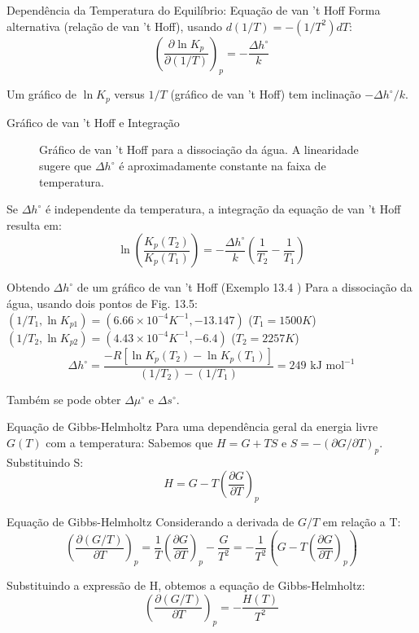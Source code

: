 \documentclass{beamer}
\begin{document}
\begin{frame}{Dependência da Temperatura do Equilíbrio: Equação de van 't Hoff}
    Forma alternativa (relação de van 't Hoff), usando $d(1/T) = -(1/T^2)dT$:
    $$ \left(\frac{\partial \ln K_p}{\partial (1/T)}\right)_p = -\frac{\Delta h^{\circ}}{k} $$
    
    Um gráfico de $\ln K_p$ versus $1/T$ (gráfico de van 't Hoff) tem inclinação $-\Delta h^{\circ}/k$.
\end{frame}

\begin{frame}{Gráfico de van 't Hoff e Integração}
    \begin{figure}
    \centering
    \caption{Gráfico de van 't Hoff para a dissociação da água. A linearidade sugere que $\Delta h^{\circ}$ é aproximadamente constante na faixa de temperatura.}
    \end{figure}
    
    Se $\Delta h^{\circ}$ é independente da temperatura, a integração da equação de van 't Hoff resulta em:
    $$ \ln\left(\frac{K_p(T_2)}{K_p(T_1)}\right) = -\frac{\Delta h^{\circ}}{k}\left(\frac{1}{T_2} - \frac{1}{T_1}\right) $$
     
    \begin{exampleblock}{Obtendo $\Delta h^{\circ}$ de um gráfico de van 't Hoff (Exemplo 13.4 )}
        Para a dissociação da água, usando dois pontos de Fig. 13.5:
        $(1/T_1, \ln K_{p1}) = (6.66 \times 10^{-4} K^{-1}, -13.147)$ ($T_1=1500K$)
        $(1/T_2, \ln K_{p2}) = (4.43 \times 10^{-4} K^{-1}, -6.4)$ ($T_2=2257K$)
        $$ \Delta h^{\circ} = \frac{-R[\ln K_p(T_2) - \ln K_p(T_1)]}{(1/T_2) - (1/T_1)} = 249 \text{ kJ mol}^{-1} $$
        
        Também se pode obter $\Delta\mu^{\circ}$ e $\Delta s^{\circ}$.
    \end{exampleblock}
\end{frame}

\begin{frame}{Equação de Gibbs-Helmholtz}
    Para uma dependência geral da energia livre $G(T)$ com a temperatura:
    Sabemos que $H = G + TS$ e $S = -(\partial G/\partial T)_p$.
    Substituindo S:
    $$ H = G - T\left(\frac{\partial G}{\partial T}\right)_p $$
     
\end{frame}

\begin{frame}{Equação de Gibbs-Helmholtz}
    Considerando a derivada de $G/T$ em relação a T:
    $$ \left(\frac{\partial (G/T)}{\partial T}\right)_p = \frac{1}{T}\left(\frac{\partial G}{\partial T}\right)_p - \frac{G}{T^2} = -\frac{1}{T^2}\left(G - T\left(\frac{\partial G}{\partial T}\right)_p\right) $$
     
    Substituindo a expressão de H, obtemos a equação de Gibbs-Helmholtz:
    $$ \left(\frac{\partial (G/T)}{\partial T}\right)_p = -\frac{H(T)}{T^2} $$
    
\end{frame}
\end{document}
